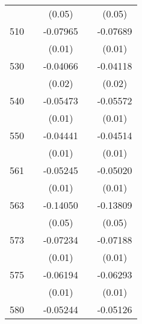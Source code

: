 \begin{table}[htbp]
\begin{tabular}{l*{4}{c}}
                    &                     &      (0.05)         &                     &      (0.05)         \\
510                 &                     &    -0.07965\sym{***}&                     &    -0.07689\sym{***}\\
                    &                     &      (0.01)         &                     &      (0.01)         \\
530                 &                     &    -0.04066\sym{*}  &                     &    -0.04118\sym{*}  \\
                    &                     &      (0.02)         &                     &      (0.02)         \\
540                 &                     &    -0.05473\sym{***}&                     &    -0.05572\sym{***}\\
                    &                     &      (0.01)         &                     &      (0.01)         \\
550                 &                     &    -0.04441\sym{**} &                     &    -0.04514\sym{**} \\
                    &                     &      (0.01)         &                     &      (0.01)         \\
561                 &                     &    -0.05245\sym{***}&                     &    -0.05020\sym{***}\\
                    &                     &      (0.01)         &                     &      (0.01)         \\
563                 &                     &    -0.14050\sym{**} &                     &    -0.13809\sym{**} \\
                    &                     &      (0.05)         &                     &      (0.05)         \\
573                 &                     &    -0.07234\sym{***}&                     &    -0.07188\sym{***}\\
                    &                     &      (0.01)         &                     &      (0.01)         \\
575                 &                     &    -0.06194\sym{***}&                     &    -0.06293\sym{***}\\
                    &                     &      (0.01)         &                     &      (0.01)         \\
580                 &                     &    -0.05244\sym{***}&                     &    -0.05126\sym{***}\\

\end{tabular}
\end{table}
